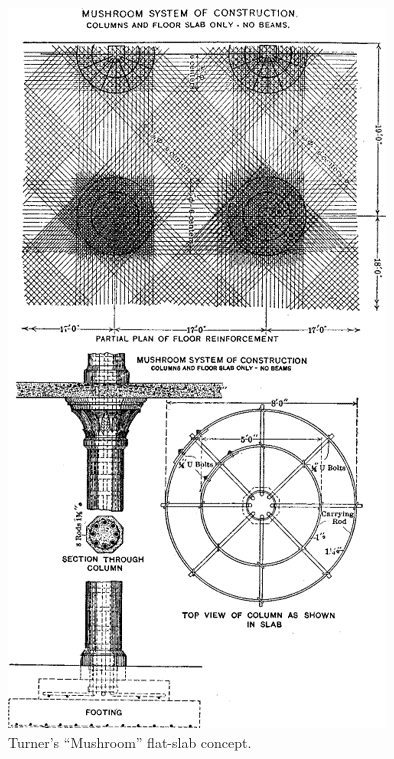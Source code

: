 \begin{figure}\centering
\includegraphics[width=\columnwidth]{Figures/t1905f6.png}
\caption{Turner's ``Mushroom'' flat-slab concept\citep{turner1905}.}\label{t1905f6}
\end{figure}

